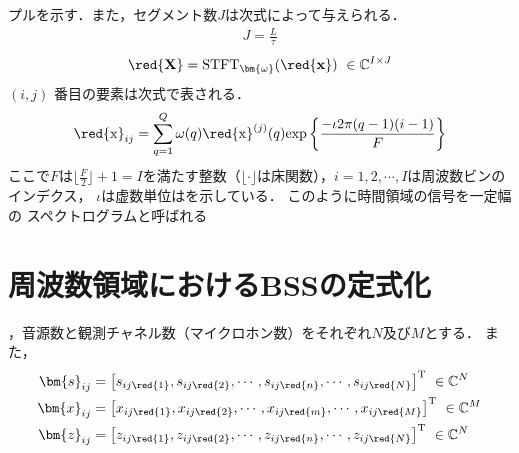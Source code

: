 プルを示す．また，セグメント数$J$は次式によって与えられる．
\begin{align}
    J = \frac{L}{\tau}
\end{align}
\begin{align}
\red{\mathbf{X}}= {\rm STFT}_{\bm{\omega}}(\red{\mathbf{x}})~\in \mathbb{C}^{I \times J}
\end{align}
$(i, j)$ 番目の要素は次式で表される．
\begin{align}
    \red{\mathrm{x}}_{ij}= \sum_{q=1}^{Q}\omega(q) \red{\mathrm{x}}^{(j)}(q){\rm exp}\left\{\frac{-\iota2\pi(q-1)(i-1)}{F}\right\}
\end{align}
ここで$F$は$\lfloor \frac{F}{2}\rfloor+1 =I$を満たす整数（$\lfloor \cdot \rfloor$は床関数），$i= 1, 2, \cdots , I$は周波数ビンのインデクス，
$\iota$は虚数単位はを示している．
このように時間領域の信号を一定幅の
スペクトログラムと呼ばれる


\section{周波数領域におけるBSSの定式化}
\label{sec:formularization}
，音源数と観測チャネル数（マイクロホン数）をそれぞれ$N$及び$M$とする．
また，  
\begin{align}
  \bm{s}_{ij} &= \left[
	s_{ij\red{1}},s_{ij\red{2}}, \cdots, s_{ij\red{n}}, \cdots, s_{ij\red{N}} 
  \right]^\mathrm{T}~\in \mathbb{C}^{N} \label{f:BSS_s}\\
  \bm{x}_{ij} &= \left[
      x_{ij\red{1}},x_{ij\red{2}},  \cdots, x_{ij\red{m}}, \cdots  , x_{ij\red{M}} 
  \right]^\mathrm{T}~\in \mathbb{C}^{M}  \label{f:BSS_x}\\
  \bm{z}_{ij} &= \left[
      z_{ij\red{1}},z_{ij\red{2}},  \cdots, z_{ij\red{n}}, \cdots  , z_{ij\red{N}} 
  \right]^\mathrm{T}~\in \mathbb{C}^{N} \label{f:BSS_z}
\end{align}

